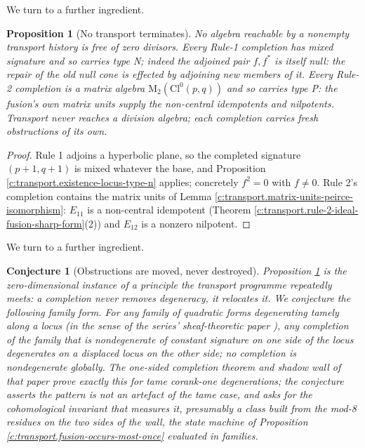 \documentclass[11pt]{article}
\newtheorem{proposition}[theorem]{Proposition}
\newtheorem{conjecture}[theorem]{Conjecture}
\theoremstyle{definition}
\theoremstyle{plain}
\providecommand{\Cl}{}\renewcommand{\Cl}{\mathrm{Cl}}
\providecommand{\Mat}{}\renewcommand{\Mat}{\mathrm{M}}
\begin{document}
We turn to a further ingredient.

\begin{proposition}[No transport terminates]\label{c:transport.no-transport-terminates}
No algebra reachable by a nonempty transport history is free of zero divisors. Every Rule-1 completion has mixed signature and so carries type N; indeed the adjoined pair $f, f^*$ is itself null: the repair of the old null cone is effected by adjoining new members of it. Every Rule-2 completion is a matrix algebra $\Mat_2(\Cl^0(p,q))$ and so carries type P: the fusion's own matrix units supply the non-central idempotents and nilpotents. Transport never reaches a division algebra; each completion carries fresh obstructions of its own.
\end{proposition}
\begin{proof}
Rule 1 adjoins a hyperbolic plane, so the completed signature $(p{+}1, q{+}1)$ is mixed whatever the base, and Proposition \ref{c:transport.existence-locus-type-n} applies; concretely $f^2 = 0$ with $f \neq 0$. Rule 2's completion contains the matrix units of Lemma \ref{c:transport.matrix-units-peirce-isomorphism}: $E_{11}$ is a non-central idempotent (Theorem \ref{c:transport.rule-2-ideal-fusion-sharp-form}(2)) and $E_{12}$ is a nonzero nilpotent.

\end{proof}

We turn to a further ingredient.

\begin{conjecture}[Obstructions are moved, never destroyed]\label{c:transport.obstructions-are-moved-never-destroyed}
Proposition \ref{c:transport.no-transport-terminates} is the zero-dimensional instance of a principle the transport programme repeatedly meets: a completion never removes degeneracy, it relocates it. We conjecture the following family form. For any family of quadratic forms degenerating tamely along a locus (in the sense of the series' sheaf-theoretic paper \cite{ButlerT4}), any completion of the family that is nondegenerate of constant signature on one side of the locus degenerates on a displaced locus on the other side; no completion is nondegenerate globally. The one-sided completion theorem and shadow wall of that paper prove exactly this for tame corank-one degenerations; the conjecture asserts the pattern is not an artefact of the tame case, and asks for the cohomological invariant that measures it, presumably a class built from the mod-8 residues on the two sides of the wall, the state machine of Proposition \ref{c:transport.fusion-occurs-most-once} evaluated in families.
\end{conjecture}
\end{document}
